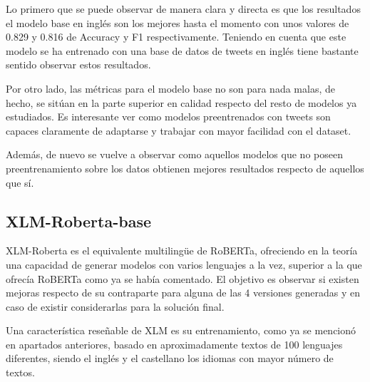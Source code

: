 Lo primero que se puede observar de manera clara y directa es que los resultados el modelo base en inglés son los mejores hasta el momento con unos valores de 0.829 y 0.816 de Accuracy y F1 respectivamente. Teniendo en cuenta que este modelo se ha entrenado con una base de datos de tweets en inglés tiene bastante sentido observar estos resultados.

Por otro lado, las métricas para el modelo base no son para nada malas, de hecho, se sitúan en la parte superior en calidad respecto del resto de modelos ya estudiados. Es interesante ver como modelos preentrenados con tweets son capaces claramente de adaptarse y trabajar con mayor facilidad con el dataset.

Además, de nuevo se vuelve a observar como aquellos modelos que no poseen preentrenamiento sobre los datos obtienen mejores resultados respecto de aquellos que sí.

\subsection{XLM-Roberta-base}
XLM-Roberta \cite{xlm-roberta} es el equivalente multilingüe de RoBERTa, ofreciendo en la teoría una capacidad de generar modelos con varios lenguajes a la vez, superior a la que ofrecía RoBERTa como ya se había comentado. El objetivo es observar si existen mejoras respecto de su contraparte para alguna de las 4 versiones generadas y en caso de existir considerarlas para la solución final.

Una característica reseñable de XLM es su entrenamiento, como ya se mencionó en apartados anteriores, basado en aproximadamente textos de 100 lenguajes diferentes, siendo el inglés y el castellano los idiomas con mayor número de textos.


